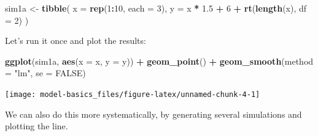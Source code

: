 \documentclass[]{book}
\newenvironment{Shaded}{\begin{snugshade}}{\end{snugshade}}
\newcommand{\DataTypeTok}[1]{\textcolor[rgb]{0.13,0.29,0.53}{#1}}
\newcommand{\DecValTok}[1]{\textcolor[rgb]{0.00,0.00,0.81}{#1}}
\newcommand{\FloatTok}[1]{\textcolor[rgb]{0.00,0.00,0.81}{#1}}
\newcommand{\KeywordTok}[1]{\textcolor[rgb]{0.13,0.29,0.53}{\textbf{#1}}}
\newcommand{\NormalTok}[1]{#1}
\newcommand{\OperatorTok}[1]{\textcolor[rgb]{0.81,0.36,0.00}{\textbf{#1}}}
\newcommand{\OtherTok}[1]{\textcolor[rgb]{0.56,0.35,0.01}{#1}}
\newcommand{\StringTok}[1]{\textcolor[rgb]{0.31,0.60,0.02}{#1}}
\theoremstyle{plain}
\theoremstyle{remark}
\begin{document}
\begin{Shaded}
\begin{Highlighting}[]
\NormalTok{sim1a <-}\StringTok{ }\KeywordTok{tibble}\NormalTok{(}
  \DataTypeTok{x =} \KeywordTok{rep}\NormalTok{(}\DecValTok{1}\OperatorTok{:}\DecValTok{10}\NormalTok{, }\DataTypeTok{each =} \DecValTok{3}\NormalTok{),}
  \DataTypeTok{y =}\NormalTok{ x }\OperatorTok{*}\StringTok{ }\FloatTok{1.5} \OperatorTok{+}\StringTok{ }\DecValTok{6} \OperatorTok{+}\StringTok{ }\KeywordTok{rt}\NormalTok{(}\KeywordTok{length}\NormalTok{(x), }\DataTypeTok{df =} \DecValTok{2}\NormalTok{)}
\NormalTok{)}
\end{Highlighting}
\end{Shaded}

Let's run it once and plot the results:

\begin{Shaded}
\begin{Highlighting}[]
\KeywordTok{ggplot}\NormalTok{(sim1a, }\KeywordTok{aes}\NormalTok{(}\DataTypeTok{x =}\NormalTok{ x, }\DataTypeTok{y =}\NormalTok{ y)) }\OperatorTok{+}
\StringTok{  }\KeywordTok{geom_point}\NormalTok{() }\OperatorTok{+}
\StringTok{  }\KeywordTok{geom_smooth}\NormalTok{(}\DataTypeTok{method =} \StringTok{"lm"}\NormalTok{, }\DataTypeTok{se =} \OtherTok{FALSE}\NormalTok{)}
\end{Highlighting}
\end{Shaded}

\begin{center}\texttt{[image: model-basics\_files/figure-latex/unnamed-chunk-4-1]} \end{center}

We can also do this more systematically, by generating several simulations
and plotting the line.
\end{document}
